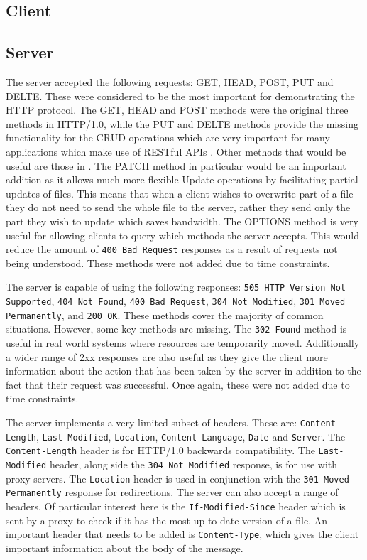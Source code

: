 \documentclass[10pt,twocolumn]{witseiepaper}
\begin{document}
	\subsection{Client}

	\subsection{Server}

	The server accepted the following requests: GET, HEAD, POST, PUT and DELTE. These were considered to be the most important for demonstrating the HTTP protocol. The GET, HEAD and POST methods were the original three methods in HTTP/1.0, while the PUT and DELTE methods provide the missing functionality for the CRUD operations which are very important for many applications which make use of RESTful APIs \cite{guinard}. Other methods that would be useful are those in . The PATCH method in particular would be an important addition as it allows much more flexible Update operations by facilitating partial updates of files. This means that when a client wishes to overwrite part of a file they do not need to send the whole file to the server, rather they send only the part they wish to update which saves bandwidth. The OPTIONS method is very useful for allowing clients to query which methods the server accepts. This would reduce the amount of \texttt{400 Bad Request} responses as a result of requests not being understood. These methods were not added due to time constraints.

	The server is capable of using the following responses: \texttt{505 HTTP Version Not Supported}, \texttt{404 Not Found}, \texttt{400 Bad Request}, \texttt{304 Not Modified}, \texttt{301 Moved Permanently}, and \texttt{200 OK}. These methods cover the majority of common situations. However, some key methods are missing. The \texttt{302 Found} method is useful in real world systems where resources are temporarily moved. Additionally a wider range of 2xx responses are also useful as they give the client more information about the action that has been taken by the server in addition to the fact that their request was successful. Once again, these were not added due to time constraints.

	The server implements a very limited subset of headers. These are: \texttt{Content-Length}, \texttt{Last-Modified}, \texttt{Location}, \texttt{Content-Language}, \texttt{Date} and \texttt{Server}. The \texttt{Content-Length} header is for HTTP/1.0 backwards compatibility. The \texttt{Last-Modified} header, along side the \texttt{304 Not Modified} response, is for use with proxy servers. The \texttt{Location} header is used in conjunction with the \texttt{301 Moved Permanently} response for redirections. The server can also accept a range of headers. Of particular interest here is the \texttt{If-Modified-Since} header which is sent by a proxy to check if it has the most up to date version of a file. An important header that needs to be added is \texttt{Content-Type}, which gives the client important information about the body of the message. 
\end{document}
